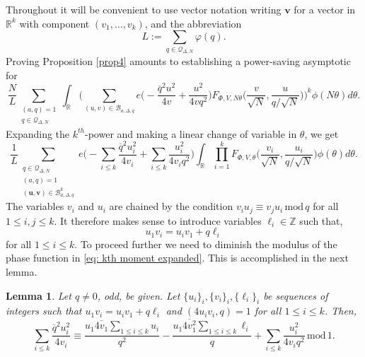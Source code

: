\documentclass[12pt,reqno]{amsart}
\theoremstyle{plain}
\newtheorem{lemma}{Lemma}
\numberwithin{equation}{section}
\numberwithin{figure}{section}
\theoremstyle{plain}
\theoremstyle{definition}
\theoremstyle{remark}
\newcommand{\mmod}{\,\mathrm{mod}\,}
\begin{document}
 Throughout it will be convenient to use vector notation writing $\boldsymbol{v}$ for a vector in $\mathbb{R}^k$ with component $(v_1, \ldots, v_k)$,
 and the abbreviation 
 $$
 L := \sum_{q \in \mathcal{Q}_{\Delta, N}} \varphi(q).
 $$
 Proving Proposition \ref{prop4} 
 amounts to establishing a power-saving asymptotic for
  $$
\frac{N}{L} \sum_{\substack{(a,q) = 1
\\ q \in \mathcal{Q}_{\Delta,N}}} \int_{\mathbb{R}} \Big ( 
\sum_{(u,v)\in\mathcal{B}_{a, \Delta, q}} e \Big (  - \frac{\overline{q}^2 u^2}{4 v} + \frac{u^2}{4 v q^2} \Big ) F_{\Phi, V, N \theta} \Big ( \frac{v}{\sqrt{N}}, \frac{u}{q / \sqrt{N}} \Big ) \Big )^k \phi(N \theta) d \theta.
 $$
Expanding the $k^{th}$-power 
and making a linear change of variable in $\theta$, we get
 \begin{equation}\label{eq: kth moment expanded}
\frac{1}{L} 
\sum_{\substack{q \in 
\mathcal{Q}_{\Delta, N}\\ (a,q) = 1 \\ (\mathbf{u}, \mathbf{v}) \in \mathcal{B}_{a, \Delta, q}^k}}
e \Big ( -\sum_{i \leq k} 
\frac{\overline{q}^2 u_i^2}{4 v_i} + \sum_{i \leq k} \frac{u_i^2}{4 v_i q^2}
\Big ) 
\int_{\mathbb{R}} 
\prod_{i = 1}^{k} 
F_{\Phi, V, \theta} 
\Big ( \frac{v_i}{\sqrt{N}}, 
\frac{u_i}{q / \sqrt{N}} \Big ) 
\phi(\theta) d \theta. 
 \end{equation}
The variables $v_i$ and $u_i$ are chained by the condition $v_i u_j \equiv v_j u_i \mmod{q}$ for all $1 \leq i, j \leq k$. 
It therefore makes sense 
to introduce variables 
$\ell_i \in \mathbb{Z}$ such that,
 $$
 u_1 v_i = u_i v_1 + q \ell_i
 $$
 for all $1 \leq i \leq k$.  %
 To proceed further 
 we need to diminish the modulus 
 of the phase function 
 in \eqref{eq: kth moment expanded}. 
 This is accomplished in the next lemma.
\begin{lemma} \label{le:transform}
  Let $q \neq 0$, odd,  be given. Let $\{u_i\}_i, \{v_i\}_i, 
  \{\ell_i\}_i$ be sequences of integers 
such that $u_1 v_i = u_i v_1 + q \ell_i$ 
and $(4 u_i v_i,q)=1$ for all $1 \leq i \leq k$.
  Then, 
  $$
  \sum_{i \leq k}
  \frac{\overline{q}^2 u_i^2}{4 v_i} \equiv \frac{u_1 \overline{4 v_1} 
  \sum_{1 \leq i \leq k} u_i}{q^2} - \frac{u_1 \overline{4 v_1^2} 
  \sum_{1 \leq i \leq k} \ell_i}{q} 
  + \sum_{i \leq k} \frac{u_i^2}{4 v_i q^2} \mmod{1}.
  $$
  \end{lemma}
\end{document}
